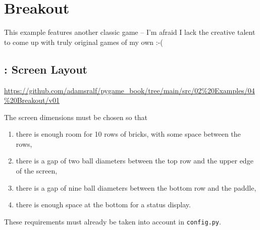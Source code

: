 
\newpage
\section{Breakout}
This example features another classic game -- I'm afraid I lack the creative talent to come up with truly original games of my own :-(

\subsection{: Screen Layout}

\begin{diskbox}
	\url{https://github.com/adamsralf/pygame_book/tree/main/src/02%20Examples/04%20Breakout/v01}
\end{diskbox}

The screen dimensions must be chosen so that
\begin{enumerate}
	\item there is enough room for 10 rows of bricks, with some space between the rows,
	\item there is a gap of two ball diameters between the top row and the upper edge of the screen,
	\item there is a gap of nine ball diameters between the bottom row and the paddle,
	\item there is enough space at the bottom for a status display.
\end{enumerate}
\er

These requirements must already be taken into account in \texttt{config.py}.



